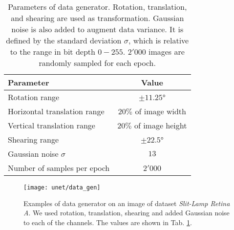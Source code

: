 \begin{table}[!htbp]
   \centering
   \caption[Data generator parameters]{Parameters of data generator. Rotation, translation, and shearing are used as transformation. Gaussian noise is also added to augment data variance. It is defined by the standard deviation $\sigma$, which is relative to the range in bit depth $0-255$. $2'000$ images are randomly sampled for each epoch.}
   \begin{tabular}{l|c}
      \toprule
      \textbf{Parameter} & \textbf{Value} \\
      \midrule
      Rotation range & $\pm11.25$° \\
      Horizontal translation range & $20\%$ of image width \\
      Vertical translation range & $20\%$ of image height \\
      Shearing range & $\pm22.5$° \\
      \midrule
      Gaussian noise $\sigma$ & $13$ \\
      \midrule
      Number of samples per epoch & $2'000$ \\
      \bottomrule
   \end{tabular}
   \label{tab:data_gen_param}
\end{table}
\vspace{30pt}

\begin{figure}[!htbp]
  \centering
  \texttt{[image: unet/data\_gen]}
  \caption[Examples of data generator]{Examples of data generator on an image of dataset \textit{Slit-Lamp Retina A}. We used rotation, translation, shearing and added Gaussian noise to each of the channels. The values are shown in Tab. \ref{tab:data_gen_param}.}
  \label{fig:data_gen}
\end{figure}


